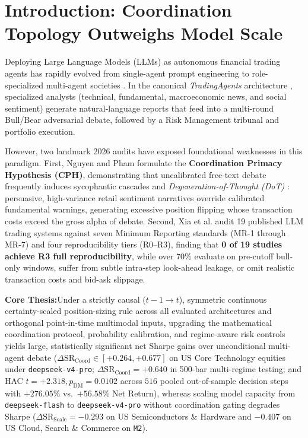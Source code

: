 \documentclass[10pt,a4paper,twocolumn]{article}
\newcommand{\takeaway}[2]{%
  \vspace{3pt}\noindent\colorbox{lightbg}{%
    \parbox{\dimexpr\columnwidth-2\fboxsep\relax}{%
      \vspace{2pt}\textbf{\color{primary}#1:}\hspace{0.4em}#2\vspace{2pt}%
    }%
  }\vspace{3pt}%
}
\begin{document}
\begin{abstract}
Meanwhile, scaling model capacity from \texttt{deepseek-flash} to \texttt{deepseek-v4-pro} without coordination gating yields negative Sharpe differentials ($\Delta\text{SR}_{\text{Scale}} = -0.293$ on Semiconductors/Hardware and $-0.407$ on Cloud/Search on \texttt{M2}), empirically confirming the \textbf{Coordination Primacy Hypothesis}.
\end{abstract}

\section{Introduction: Coordination Topology Outweighs Model Scale}

Deploying Large Language Models (LLMs) as autonomous financial trading agents has rapidly evolved from single-agent prompt engineering to role-specialized multi-agent societies \cite{xiao2024tradingagents,yu2024fincon,li2024hedgeagents}. In the canonical \textit{TradingAgents} architecture \cite{xiao2024tradingagents}, specialized analysts (technical, fundamental, macroeconomic news, and social sentiment) generate natural-language reports that feed into a multi-round Bull/Bear adversarial debate, followed by a Risk Management tribunal and portfolio execution.

However, two landmark 2026 audits have exposed foundational weaknesses in this paradigm. First, Nguyen and Pham \cite{nguyen2026cph} formulate the \textbf{Coordination Primacy Hypothesis (CPH)}, demonstrating that uncalibrated free-text debate frequently induces sycophantic cascades and \textit{Degeneration-of-Thought (DoT)} \cite{liang2023dot,du2023debate}: persuasive, high-variance retail sentiment narratives override calibrated fundamental warnings, generating excessive position flipping whose transaction costs exceed the gross alpha of debate. Second, Xia et al. \cite{xia2026audit} audit 19 published LLM trading systems against seven Minimum Reporting standards (MR-1 through MR-7) and four reproducibility tiers (R0--R3), finding that \textbf{0 of 19 studies achieve R3 full reproducibility}, while over 70\% evaluate on pre-cutoff bull-only windows, suffer from subtle intra-step look-ahead leakage, or omit realistic transaction costs and bid-ask slippage.

\takeaway{Core Thesis}{Under a strictly causal ($t-1 \to t$), symmetric continuous certainty-scaled position-sizing rule across all evaluated architectures and orthogonal point-in-time multimodal inputs, upgrading the mathematical coordination protocol, probability calibration, and regime-aware risk controls yields large, statistically significant net Sharpe gains over unconditional multi-agent debate ($\Delta\text{SR}_{\text{Coord}} \in [+0.264, +0.677]$ on US Core Technology equities under \texttt{deepseek-v4-pro}; $\Delta\text{SR}_{\text{Coord}} = +0.640$ in 500-bar multi-regime testing; and HAC $t = +2.318, p_{\text{DM}} = 0.0102$ across $516$ pooled out-of-sample decision steps with $+276.05\%$ vs.\ $+56.58\%$ Net Return), whereas scaling model capacity from \texttt{deepseek-flash} to \texttt{deepseek-v4-pro} without coordination gating degrades Sharpe ($\Delta\text{SR}_{\text{Scale}} = -0.293$ on US Semiconductors \& Hardware and $-0.407$ on US Cloud, Search \& Commerce on \texttt{M2}).}
\end{document}
